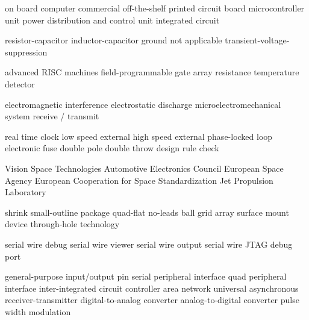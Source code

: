      {on board computer}
    {commercial off-the-shelf}
     {printed circuit board}
     {microcontroller unit}
    {power distribution and control unit}
      {integrated circuit}

      {resistor-capacitor}
      {inductor-capacitor}
     {ground}
      {not applicable}
     {transient-voltage-suppression}

     {advanced RISC machines}
    {field-programmable gate array}
     {resistance temperature detector}

     {electromagnetic interference}
     {electrostatic discharge}
    {microelectromechanical system}
   {receive / transmit}

     {real time clock}
     {low speed external}
     {high speed external}
     {phase-locked loop}
   {electronic fuse}
    {double pole double throw}
     {design rule check}

     {Vision Space Technologies}
     {Automotive Electronics Council}
     {European Space Agency}
   {European Cooperation for Space Standardization}
     {Jet Propulsion Laboratory}

    {shrink small-outline package}
     {quad-flat no-leads}
     {ball grid array}
     {surface mount device}
     {through-hole technology}

     {serial wire debug}
     {serial wire viewer}
     {serial wire output}
  {serial wire JTAG debug port}

    {general-purpose input/output pin}
     {serial peripheral interface}
     {quad peripheral interface}
 {inter-integrated circuit}
     {controller area network}
    {universal asynchronous receiver-transmitter}
     {digital-to-analog converter}
     {analog-to-digital converter}
     {pulse width modulation}
